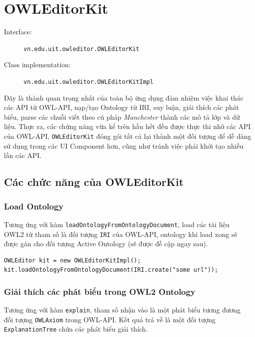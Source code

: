 \section{OWLEditorKit}
\begin{description}
\item[Interface:] \verb|vn.edu.uit.owleditor.OWLEditorKit|
\item[Class implementation:] \verb|vn.edu.uit.owleditor.OWLEditorKitImpl|
\end{description}
Đây là thành quan trọng nhất của toàn bộ ứng dụng đảm nhiệm việc khai thác các API từ OWL-API, nạp/tạo Ontology từ IRI, suy luận, giải thích các phát biểu, parse các chuỗi viết theo cú pháp \textit{Manchester} thành các mô tả lớp và dữ liệu. Thực ra, các chứng năng vừa kể trên hầu hết đều được thực thi nhờ các API của OWL-API, \verb|OWLEditorKit| đóng gói tất cả lại thành một đối tượng để dễ dàng sử dụng trong các UI Component hơn, cũng như tránh việc phải khởi tạo nhiều lần các API.
\subsection{Các chức năng của OWLEditorKit}

\subsubsection{Load Ontology}
Tương ứng với hàm \verb|loadOntologyFromOntologyDocument|, load các tài liệu OWL2 từ tham số là đối tượng \verb|IRI| của OWL-API, ontology khi load xong sẽ được gán cho đối tượng Active Ontology (sẽ được đề cập ngay sau).
\begin{verbatim}
OWLEditor kit = new OWLEditorKitImpl();
kit.loadOntologyFromOntologyDocument(IRI.create("some url"));
\end{verbatim}
\subsubsection{Giải thích các phát biểu trong OWL2 Ontology}
Tương ứng với hàm \verb|explain|, tham số nhận vào là một phát biểu tương đương đối tượng \verb|OWLAxiom| trong OWL-API. Kết quả trả về là một đối tượng \verb|ExplanationTree| chứa các phát biểu giải thích.


